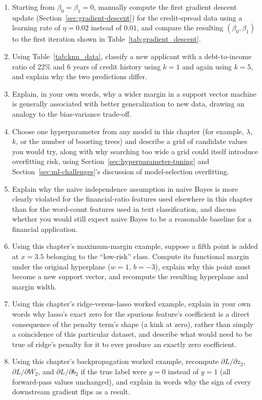 \documentclass[../ai_in_finance]{subfiles}
\begin{document}
\begin{enumerate}[exercises]
    \item Starting from $\beta_0=\beta_1=0$, manually compute the first gradient descent update (Section~\ref{sec:gradient-descent}) for the credit-spread data using a learning rate of $\eta=0.02$ instead of $0.01$, and compare the resulting $(\beta_0,\beta_1)$ to the first iteration shown in Table~\ref{tab:gradient_descent}.
    \item Using Table~\ref{tab:knn_data}, classify a new applicant with a debt-to-income ratio of 22\% and 6 years of credit history using $k=1$ and again using $k=5$, and explain why the two predictions differ.
    \item Explain, in your own words, why a wider margin in a support vector machine is generally associated with better generalization to new data, drawing an analogy to the bias-variance trade-off.
    \item Choose one hyperparameter from any model in this chapter (for example, $\lambda$, $k$, or the number of boosting trees) and describe a grid of candidate values you would try, along with why searching too wide a grid could itself introduce overfitting risk, using Section~\ref{sec:hyperparameter-tuning} and Section~\ref{sec:ml-challenges}'s discussion of model-selection overfitting.
    \item Explain why the naive independence assumption in naive Bayes is more clearly violated for the financial-ratio features used elsewhere in this chapter than for the word-count features used in text classification, and discuss whether you would still expect naive Bayes to be a reasonable baseline for a financial application.
    \item Using this chapter's maximum-margin example, suppose a fifth point is added at $x=3.5$ belonging to the ``low-risk'' class. Compute its functional margin under the original hyperplane ($w=1$, $b=-3$), explain why this point must become a new support vector, and recompute the resulting hyperplane and margin width.
    \item Using this chapter's ridge-versus-lasso worked example, explain in your own words why lasso's exact zero for the spurious feature's coefficient is a direct consequence of the penalty term's shape (a kink at zero), rather than simply a coincidence of this particular dataset, and describe what would need to be true of ridge's penalty for it to ever produce an exactly zero coefficient.
    \item Using this chapter's backpropagation worked example, recompute $\partial L/\partial z_2$, $\partial L/\partial W_2$, and $\partial L/\partial b_2$ if the true label were $y=0$ instead of $y=1$ (all forward-pass values unchanged), and explain in words why the sign of every downstream gradient flips as a result.

\end{enumerate}
\end{document}
